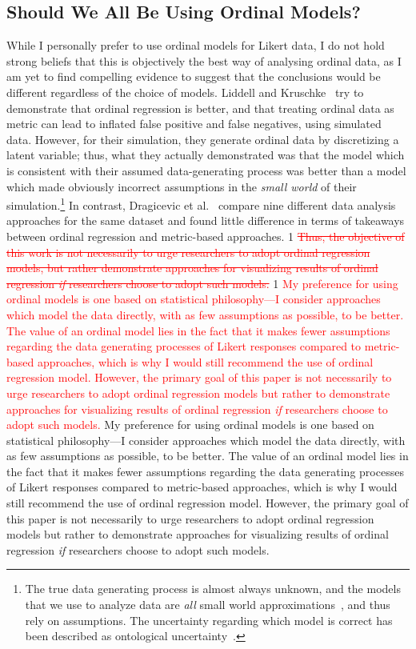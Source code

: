 \documentclass{vgtc}                          %
\def\trackchanges{0}
\newcommand{\new}[1]{%
\if\trackchanges1%
\textcolor{red}{#1}%
\else#1\fi}
\newcommand{\stout}[1]{\if\trackchanges1 \textcolor{red}{\sout{#1}} \fi}
\begin{document}
\subsection{Should We All Be Using Ordinal Models?}
\label{sec:is-ordinal-better}
While I personally prefer to use ordinal models for Likert data, I do not hold strong beliefs that this is objectively the best way of analysing ordinal data, as I am yet to find compelling evidence to suggest that the conclusions would be different regardless of the choice of models. Liddell and Kruschke~\cite{liddell_analyzing_2018} try to demonstrate that ordinal regression is better, and that treating ordinal data as metric can lead to inflated false positive and false negatives, using simulated data. However, for their simulation, they generate ordinal data by discretizing a latent variable; thus, what they actually demonstrated was that the model which is consistent with their assumed data-generating process was better than a model which made obviously incorrect assumptions in the \textit{small world} of their simulation.\footnote{The true data generating process is almost always unknown, and the models that we use to analyze data are \textit{all} small world approximations~\cite{savage_foundations_1972}, and thus rely on assumptions. The uncertainty regarding which model is correct has been described as ontological uncertainty~\cite{spiegelhalter_risk_2017, sarma_milliways_2024, sarma_more_2025}.} In contrast, Dragicevic et al.~\cite{dragicevic_increasing_2019} compare nine different data analysis approaches for the same dataset and found little difference in terms of takeaways between ordinal regression and metric-based approaches. 
\stout{
Thus, the objective of this work is not necessarily to urge researchers to adopt ordinal regression models, but rather demonstrate approaches for visualizing results of ordinal regression \textit{if} researchers choose to adopt such models.
}
\new{My preference for using ordinal models is one based on statistical philosophy---I consider approaches which model the data directly, with as few assumptions as possible, to be better. The value of an ordinal model lies in the fact that it makes fewer assumptions regarding the data generating processes of Likert responses compared to metric-based approaches, which is why I would still recommend the use of ordinal regression model. However, the primary goal of this paper is not necessarily to urge researchers to adopt ordinal regression models but rather to demonstrate approaches for visualizing results of ordinal regression \textit{if} researchers choose to adopt such models.}
\end{document}
